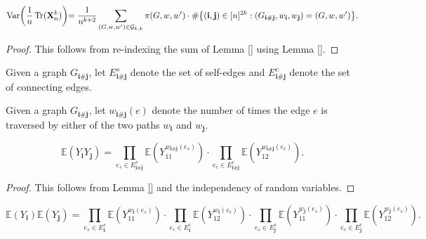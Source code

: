 \begin{lemma}[R-2-5]
  \label{}%
  \uses{}%
  \[
  \text{Var} \biggl(\frac{1}{n} \operatorname{Tr} (\mathbf{X}_n^k) \biggl) 
  = \frac{1}{n^{k+2}} \sum_{(G,w,w') \in \mathcal{G}_{k,k}} \pi(G,w,w')
\cdot \# \bigl\{ (\mathbf{i},\mathbf{j}) \in [n]^{2k} : (G_{\mathbf{i} \# \mathbf{j}},w_\mathbf{i},w_\mathbf{j}) = (G,w,w') \bigl\}.
  \]
\end{lemma}
\begin{proof}
  This follows from re-indexing the sum of Lemma \ref{} using Lemma \ref{}.
\end{proof}
\begin{definition}[R-2-6]
  \label{}%
  \uses{}%
  Given a graph $G_{\mathbf{i} \# \mathbf{j}}$, 
  let $E^s_{\mathbf{i} \# \mathbf{j}}$ denote the set of self-edges and $E^c_{\mathbf{i} \# \mathbf{j}}$ denote the set of connecting edges.
\end{definition}
\begin{definition}[R-2-7]
  \label{}%
  \uses{}%
  Given a graph $G_{\mathbf{i} \# \mathbf{j}}$, 
  let $w_{\mathbf{i} \# \mathbf{j}}(e)$ denote the number of times the edge $e$ is traversed by either of the two paths $w_\mathbf{i}$ and $w_\mathbf{j}$.
\end{definition}
\begin{lemma}[R-2-8]
  \label{}%
  \uses{}%
  \[
  \mathbb{E} (Y_\mathbf{i}Y_\mathbf{j}) 
  = \prod_{e_s \in E^s_{\mathbf{i} \# \mathbf{j}}} \mathbb{E} (Y_{11}^{w_{\mathbf{i} \# \mathbf{j}}(e_s)}) \cdot \prod_{e_c \in E^c_{\mathbf{i} \# \mathbf{j}}} \mathbb{E} (Y_{12}^{w_{\mathbf{i} \# \mathbf{j}}(e_c)}).
  \]
\end{lemma}
\begin{proof}
  This follows from Lemma \ref{} and the independency of random variables.
\end{proof}
\begin{lemma}[R-2-9]
  \label{}%
  \uses{}%
  \[
  \mathbb{E}(Y_\mathbf{i}) \mathbb{E}(Y_\mathbf{j}) 
  = \prod_{e_s \in E^s_{\mathbf{i}}} \mathbb{E} (Y_{11}^{w_{\mathbf{i}}(e_s)}) \cdot \prod_{e_c \in E^c_{\mathbf{i}}} \mathbb{E} (Y_{12}^{w_{\mathbf{i}}(e_c)})
  \cdot \prod_{e_s \in E^s_{\mathbf{j}}} \mathbb{E} (Y_{11}^{w_{\mathbf{j}}(e_s)}) \cdot \prod_{e_c \in E^c_{\mathbf{j}}} \mathbb{E} (Y_{12}^{w_{\mathbf{j}}(e_c)}).
  \]
\end{lemma}
